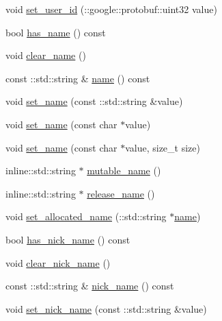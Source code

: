 \begin{DoxyCompactItemize}
\item 
void \hyperlink{class_i_m_1_1_base_define_1_1_server_user_info_ad21d344f8c65c819ef7fe550ccccc578}{set\+\_\+user\+\_\+id} (\+::google\+::protobuf\+::uint32 value)
\item 
bool \hyperlink{class_i_m_1_1_base_define_1_1_server_user_info_a407cfc731055ae0f9af332280bd53de5}{has\+\_\+name} () const 
\item 
void \hyperlink{class_i_m_1_1_base_define_1_1_server_user_info_a7ec5c421934dcdd4ffaa6f96f80c2a82}{clear\+\_\+name} ()
\item 
const \+::std\+::string \& \hyperlink{class_i_m_1_1_base_define_1_1_server_user_info_a0bb48f4bf1c5685c3407c6ed4178abc2}{name} () const 
\item 
void \hyperlink{class_i_m_1_1_base_define_1_1_server_user_info_a754575c5b7cb0ce6fe9fe699edf73548}{set\+\_\+name} (const \+::std\+::string \&value)
\item 
void \hyperlink{class_i_m_1_1_base_define_1_1_server_user_info_aac179339a986990d66697c934ef3170c}{set\+\_\+name} (const char $\ast$value)
\item 
void \hyperlink{class_i_m_1_1_base_define_1_1_server_user_info_a5526989e31dda332cf38c472359ba9fc}{set\+\_\+name} (const char $\ast$value, size\+\_\+t size)
\item 
inline\+::std\+::string $\ast$ \hyperlink{class_i_m_1_1_base_define_1_1_server_user_info_a8bfc7444b6ebd4c80773c777f6d78369}{mutable\+\_\+name} ()
\item 
inline\+::std\+::string $\ast$ \hyperlink{class_i_m_1_1_base_define_1_1_server_user_info_a449f2466b2e6488c567109889de9e01b}{release\+\_\+name} ()
\item 
void \hyperlink{class_i_m_1_1_base_define_1_1_server_user_info_a77cee9f0cd339a144fd144c494ec5066}{set\+\_\+allocated\+\_\+name} (\+::std\+::string $\ast$\hyperlink{class_i_m_1_1_base_define_1_1_server_user_info_a0bb48f4bf1c5685c3407c6ed4178abc2}{name})
\item 
bool \hyperlink{class_i_m_1_1_base_define_1_1_server_user_info_a3405709e0099627a3c31c0e629fddac0}{has\+\_\+nick\+\_\+name} () const 
\item 
void \hyperlink{class_i_m_1_1_base_define_1_1_server_user_info_a217ce79801a9762e55f4e61364cbd8f8}{clear\+\_\+nick\+\_\+name} ()
\item 
const \+::std\+::string \& \hyperlink{class_i_m_1_1_base_define_1_1_server_user_info_a521f26d05e7b0a812021060a2f0ba57b}{nick\+\_\+name} () const 
\item 
void \hyperlink{class_i_m_1_1_base_define_1_1_server_user_info_a39f20d57943abe9634a76960a1948b72}{set\+\_\+nick\+\_\+name} (const \+::std\+::string \&value)

\end{DoxyCompactItemize}
